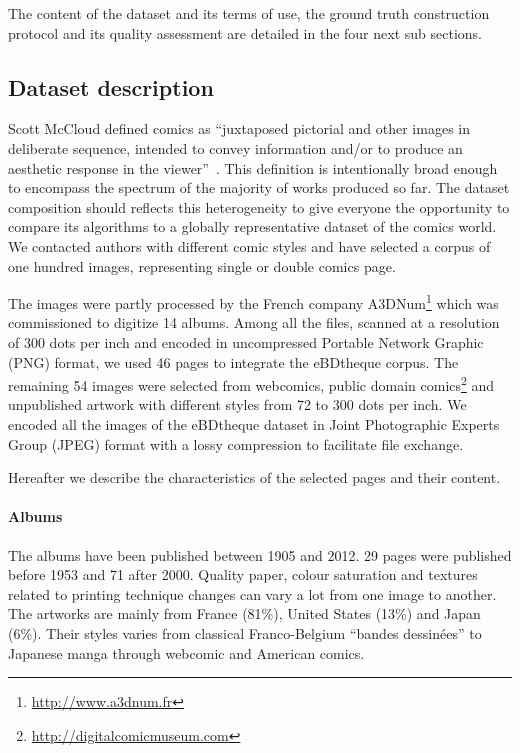 The content of the dataset and its terms of use, the ground truth construction protocol and its quality assessment are detailed in the four next sub sections.



\subsection{Dataset description} %
\label{sec:dataset_description}


Scott McCloud defined comics as ``juxtaposed pictorial and other images in deliberate sequence, intended to convey information and/or to produce an aesthetic response in the viewer''~\cite{mccloud1994understanding}.
This definition is intentionally broad enough to encompass the spectrum of the majority of works produced so far.
The dataset composition should reflects this heterogeneity to give everyone the opportunity
to compare its algorithms to a globally representative dataset of the comics world.
We contacted authors with different comic styles and have selected a corpus of one hundred images, representing single or double comics page.

The images were partly processed by the French company A3DNum\footnote{\url{http://www.a3dnum.fr}} which was commissioned to digitize 14 albums.
Among all the files, scanned at a resolution of 300 dots per inch and encoded in uncompressed Portable Network Graphic (PNG) format, we used 46 pages to integrate the eBDtheque corpus.
The remaining 54 images were selected from webcomics, public domain comics\footnote{\url{http://digitalcomicmuseum.com}} and unpublished artwork with different styles from 72 to 300 dots per inch.
We encoded all the images of the eBDtheque dataset in Joint Photographic Experts Group (JPEG) format with a lossy compression to facilitate file exchange.

Hereafter we describe the characteristics of the selected pages and their content.


\paragraph{Albums} %
 \label{par:albums}
 The albums have been published between 1905 and 2012.
 29 pages were published before 1953 and 71 after 2000.
 Quality paper, colour saturation and textures related to printing technique changes can vary a lot from one image to another.
 The artworks are mainly from France (81\%), United States (13\%) and Japan (6\%).
 Their styles varies from classical Franco-Belgium ``bandes dessinées'' to Japanese manga through webcomic and American comics.

